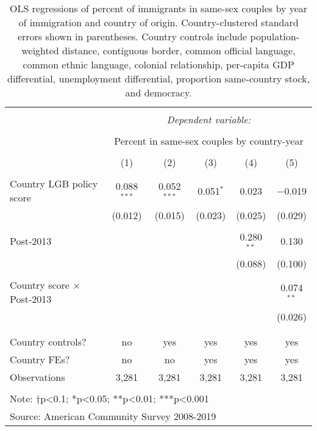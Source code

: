 \documentclass[
  11pt,
]{article}
\begin{document}
\begin{table}[!htbp] \centering 
  \caption{OLS regressions of percent of immigrants in same-sex couples by year of immigration and country of origin. Country-clustered standard errors shown in parentheses. Country controls include population-weighted distance, contiguous border, common official language, common ethnic language, colonial relationship, per-capita GDP differential, unemployment differential, proportion same-country stock, and democracy.} 
  \label{tab:country-props} 
\begin{tabular}{@{\extracolsep{5pt}}lccccc} 
\\[-1.8ex]\hline 
\hline \\[-1.8ex] 
 & \multicolumn{5}{c}{\textit{Dependent variable:}} \\ 
\cline{2-6} 
\\[-1.8ex] & \multicolumn{5}{c}{Percent in same-sex couples by country-year} \\ 
\\[-1.8ex] & (1) & (2) & (3) & (4) & (5)\\ 
\hline \\[-1.8ex] 
 Country LGB policy score & 0.088$^{***}$ & 0.052$^{***}$ & 0.051$^{*}$ & 0.023 & $-$0.019 \\ 
  & (0.012) & (0.015) & (0.023) & (0.025) & (0.029) \\ 
  & & & & & \\ 
 Post-2013 &  &  &  & 0.280$^{**}$ & 0.130 \\ 
  &  &  &  & (0.088) & (0.100) \\ 
  & & & & & \\ 
 Country score × Post-2013 &  &  &  &  & 0.074$^{**}$ \\ 
  &  &  &  &  & (0.026) \\ 
  & & & & & \\ 
\hline \\[-1.8ex] 
Country controls? & no & yes & yes & yes & yes \\ 
Country FEs? & no & no & yes & yes & yes \\ 
Observations & 3,281 & 3,281 & 3,281 & 3,281 & 3,281 \\ 
\hline 
\hline \\[-1.8ex] 
\multicolumn{6}{l}{Note: †p<0.1; *p<0.05; **p<0.01; ***p<0.001} \\ 
\multicolumn{6}{l}{Source: American Community Survey 2008-2019} \\ 
\end{tabular} 
\end{table}
\end{document}
